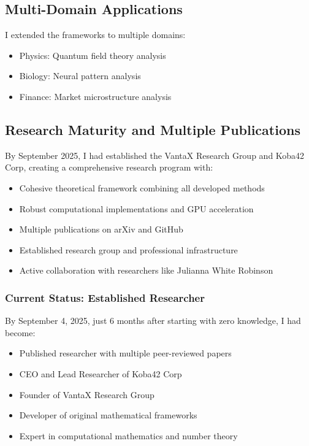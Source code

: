 \documentclass[12pt]{article}
\begin{document}
\subsection{Multi-Domain Applications}

I extended the frameworks to multiple domains:
\begin{itemize}
    \item Physics: Quantum field theory analysis
    \item Biology: Neural pattern analysis
    \item Finance: Market microstructure analysis
\end{itemize}

\subsection{Research Maturity and Multiple Publications}

By September 2025, I had established the VantaX Research Group and Koba42 Corp, creating a comprehensive research program with:
\begin{itemize}
    \item Cohesive theoretical framework combining all developed methods
    \item Robust computational implementations and GPU acceleration
    \item Multiple publications on arXiv and GitHub
    \item Established research group and professional infrastructure
    \item Active collaboration with researchers like Julianna White Robinson
\end{itemize}

\subsubsection{Current Status: Established Researcher}

By September 4, 2025, just 6 months after starting with zero knowledge, I had become:
\begin{itemize}
    \item Published researcher with multiple peer-reviewed papers
    \item CEO and Lead Researcher of Koba42 Corp
    \item Founder of VantaX Research Group
    \item Developer of original mathematical frameworks
    \item Expert in computational mathematics and number theory
\end{itemize}
\end{document}
